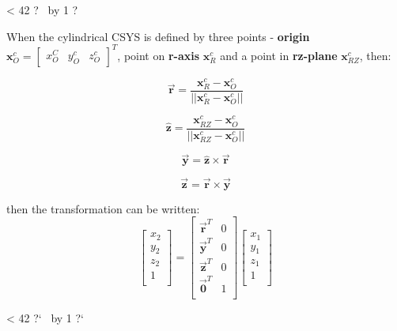 \documentclass[10pt,b5paper,titlepage]{book}
\newcommand{\m}{\mathbf}
\newcommand{\repeatit}[3][10]{%
    \myloopcounter1%
    \loop\ifnum\myloopcounter < #1
    #2#3%
    \advance\myloopcounter by 1%
    \repeat%
    #2%
}
\newenvironment{qbox}
{
\begin{center}
    \repeatit[42]{?}{\ }
\end{center}
}
{
\begin{center}
    \repeatit[42]{?`}{\ }
\end{center}
}
\begin{document}
\begin{qbox}
\begin{enumerate}
            When the cylindrical CSYS is defined by three points - \textbf{origin}
             $ \m{x}_O^c = \begin{bmatrix} x_O^C & y_O^c & z_O^c \end{bmatrix}^T $,
             point on \textbf{r-axis} $ \m{x}_{R}^c $
            and a point in \textbf{rz-plane} $ \m{x}_{RZ}^c $, then:

            \begin{equation}
                \vec{\m{r}} = \frac{\m{x}_R^c - \m{x}_O^c}{||\m{x}_R^c - \m{x}_O^c||}
            \end{equation}

            \begin{equation}
                \hat{\m{z}} = \frac{\m{x}_{RZ}^c - \m{x}_O^c}{||\m{x}_{RZ}^c - \m{x}_O^c||}
            \end{equation}

            \begin{equation}
                \vec{\m{y}} = \hat{\m{z}} \times \vec{\m{r}}
            \end{equation}

            \begin{equation}
                \vec{\m{z}} = \vec{\m{r}} \times \vec{\m{y}}
            \end{equation}

            then the transformation can be written:
            \begin{equation}
                \begin{bmatrix}
                    x_2 \\
                    y_2 \\
                    z_2 \\
                    1 \\
                \end{bmatrix}
                = \begin{bmatrix}
                    \vec{\m{r}}^T & 0 \\
                    \vec{\m{y}}^T & 0 \\
                    \vec{\m{z}}^T & 0 \\
                    \vec{\m{0}}^T & 1 \\
                \end{bmatrix}
                \begin{bmatrix}
                    x_1 \\
                    y_1 \\
                    z_1 \\
                    1 \\
                \end{bmatrix}
            \end{equation}


\end{enumerate}
\end{qbox}
\end{document}
